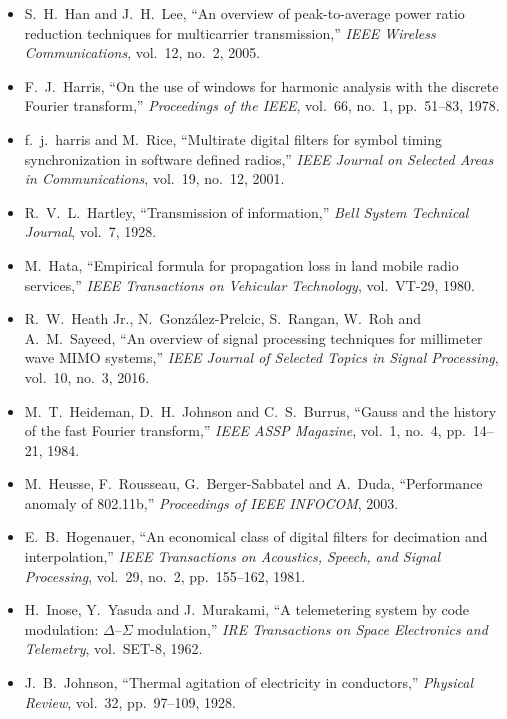 \begin{itemize}[leftmargin=1.5em,itemindent=-1.5em,itemsep=1.5pt plus 1pt,parsep=0pt,topsep=4pt,label={}]
\item S.~H.~Han and J.~H.~Lee, ``An overview of peak-to-average power ratio reduction techniques for multicarrier transmission,'' \emph{IEEE Wireless Communications}, vol.~12, no.~2, 2005.
\item F.~J.~Harris, ``On the use of windows for harmonic analysis with the discrete Fourier transform,'' \emph{Proceedings of the IEEE}, vol.~66, no.~1, pp.~51--83, 1978.
\item f.~j.~harris and M.~Rice, ``Multirate digital filters for symbol timing synchronization in software defined radios,'' \emph{IEEE Journal on Selected Areas in Communications}, vol.~19, no.~12, 2001.
\item R.~V.~L.~Hartley, ``Transmission of information,'' \emph{Bell System Technical Journal}, vol.~7, 1928.
\item M.~Hata, ``Empirical formula for propagation loss in land mobile radio services,'' \emph{IEEE Transactions on Vehicular Technology}, vol.~VT-29, 1980.
\item R.~W.~Heath Jr., N.~Gonz\'alez-Prelcic, S.~Rangan, W.~Roh and A.~M.~Sayeed, ``An overview of signal processing techniques for millimeter wave MIMO systems,'' \emph{IEEE Journal of Selected Topics in Signal Processing}, vol.~10, no.~3, 2016.
\item M.~T.~Heideman, D.~H.~Johnson and C.~S.~Burrus, ``Gauss and the history of the fast Fourier transform,'' \emph{IEEE ASSP Magazine}, vol.~1, no.~4, pp.~14--21, 1984.
\item M.~Heusse, F.~Rousseau, G.~Berger-Sabbatel and A.~Duda, ``Performance anomaly of 802.11b,'' \emph{Proceedings of IEEE INFOCOM}, 2003.
\item E.~B.~Hogenauer, ``An economical class of digital filters for decimation and interpolation,'' \emph{IEEE Transactions on Acoustics, Speech, and Signal Processing}, vol.~29, no.~2, pp.~155--162, 1981.
\item H.~Inose, Y.~Yasuda and J.~Murakami, ``A telemetering system by code modulation: $\Delta$--$\Sigma$ modulation,'' \emph{IRE Transactions on Space Electronics and Telemetry}, vol.~SET-8, 1962.
\item J.~B.~Johnson, ``Thermal agitation of electricity in conductors,'' \emph{Physical Review}, vol.~32, pp.~97--109, 1928.

\end{itemize}
